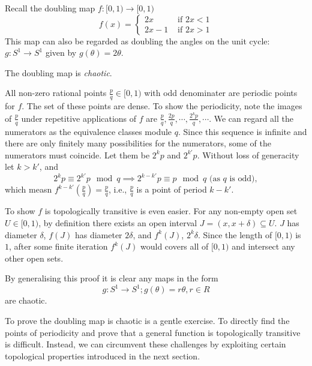 \begin{example}\label{ex_doubling_map}
	Recall the doubling map $f: [0,1) \rightarrow [0,1)$
	\begin{equation}\label{eq:doubling_map}
	f(x) = 
		\begin{cases}
			2x &\text{ if } 2x < 1 \\
			2x -1 &\text{ if } 2x > 1
		\end{cases}
	\end{equation}
	This map can also be regarded as doubling the angles on the unit cycle: $g: S^1 \rightarrow S^1$ given by $ g(\theta) = 2 \theta$.
	
	The doubling map is \textit{chaotic}.

	All non-zero rational points $\frac{p}{q} \in [0,1)$ with odd denominater are periodic points for $f$. 
	The set of these points are dense.
	To show the periodicity, note the images of $\frac{p}{q}$ under repetitive applications of $f$ are $\frac{p}{q}, \frac{2p}{q}, \cdots, \frac{2^k p}{q}, \cdots$.
	We can regard all the numerators as the equivalence classes module $q$.
	Since this sequence is infinite and there are only finitely many possibilities for the numerators, some of the numerators must coincide. Let them be $2^k p$ and $2^{k'} p$. 
	Without loss of generacity let $k > k'$, and
	$$
	2^k p \equiv 2^{k'} p \mod q \implies 
	2^{k-k'} p \equiv p \mod q \text{ (as $q$ is odd)},
	$$
	which measn $f^{k-k'}(\frac{p}{q}) = \frac{p}{q}$, i.e., $\frac{p}{q}$ is a point of period $k - k'$.

	To show $f$ is topologically transitive is even easier. 
	For any non-empty open set $U \in [0,1)$, by definition there exists an open interval $J = (x, x+ \delta) \subseteq U$. 
	$J$ has diameter $\delta$, $f(J)$ has diameter $2 \delta$, and $f^k(J)$, $2^k \delta$. 
	Since the length of $[0,1)$ is $1$, after some finite iteration $f^k(J)$ would covers all of $[0,1)$ and intersect any other open sets.

	By generalising this proof it is clear any maps in the form 
	$$
	g: S^1 \rightarrow S^1; g(\theta) = r \theta, r \in R
	$$
	are chaotic.
\end{example}

To prove the doubling map is chaotic is a gentle exercise. 
To directly find the points of periodicity and prove that a general function is topologically transitive is difficult.
Instead, we can circumvent these challenges by exploiting certain topological properties introduced in the next section.


